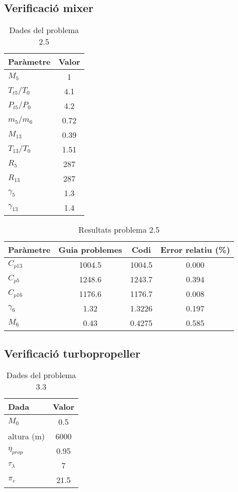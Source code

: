 \subsection{Verificació mixer}

\begin{table}[H]
\centering
\begin{tabular}{lc}
\toprule[3pt]
\textbf{Paràmetre}&\textbf{Valor}\\
\midrule[1pt]
$M_5$      & 1    \\
$T_{t5}/T_0$ & 4.1  \\
$P_{t5}/P_0$  & 4.2  \\
$m_5/m_6$   & 0.72 \\
$M_{13}$     & 0.39 \\
$T_{13}/T_0$  & 1.51 \\
$R_5$      & 287  \\
$R_{13}$     & 287  \\
$\gamma_5$ & 1.3  \\
$\gamma_{13}$ & 1.4 \\

\bottomrule[2pt]
\end{tabular}
\caption{Dades del problema 2.5}
\end{table}

\begin{table}[H]
\centering
\begin{tabular}{lccc}
\toprule[3pt]
Paràmetre & Guia problemes & Codi       & Error relatiu (\%) \\ \midrule[1pt]
$C_{p13}$& 1004.5 & 1004.5 & 0.000 \\
$C_{p5}$ & 1248.6 & 1243.7 & 0.394 \\
$C_{p16}$ & 1176.6 & 1176.7 & 0.008 \\
$\gamma_6 $& 1.32   & 1.3226 & 0.197 \\
$M_6$     & 0.43   & 0.4275 & 0.585
 \\ \bottomrule[2pt]
\end{tabular}
\caption{Resultats problema 2.5}
\end{table}


\subsection{Verificació turbopropeller}

\begin{table}[H]
\centering
\begin{tabular}{lc}
\toprule[3pt]
\textbf{Dada}&\textbf{Valor}\\
\midrule[1pt]
$M_0$      & 0.5  \\
altura (m)       & 6000 \\
$\eta_{prop}$ & 0.95 \\
$\tau_\lambda$& 7    \\
$\pi_c$& 21.5\\
\bottomrule[2pt]
\end{tabular}
\caption{Dades del problema 3.3}
\end{table}


